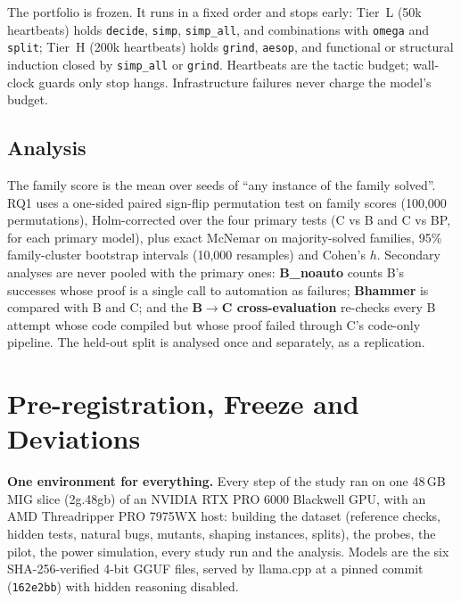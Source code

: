 \documentclass[10pt,twocolumn]{article}
\begin{document}
The portfolio is frozen. It runs in a fixed order and stops early: Tier~L (50k heartbeats) holds
\texttt{decide}, \texttt{simp}, \texttt{simp\_all}, and combinations with \texttt{omega} and \texttt{split};
Tier~H (200k heartbeats) holds \texttt{grind}, \texttt{aesop}, and functional or structural induction closed by
\texttt{simp\_all} or \texttt{grind}. Heartbeats are the tactic budget; wall-clock guards only stop hangs.
Infrastructure failures never charge the model's budget.

\subsection{Analysis}
\label{sec:analysis}
The family score is the mean over seeds of ``any instance of the family solved''. RQ1 uses a one-sided paired
sign-flip permutation test on family scores (100,000 permutations), Holm-corrected over the four primary tests
(C vs B and C vs BP, for each primary model), plus exact McNemar on majority-solved families, 95\%
family-cluster bootstrap intervals (10,000 resamples) and Cohen's $h$. Secondary analyses are never pooled with
the primary ones: \textbf{B\_noauto} counts B's successes whose proof is a single call to automation as
failures; \textbf{Bhammer} is compared with B and C; and the \textbf{B$\to$C cross-evaluation} re-checks every
B attempt whose code compiled but whose proof failed through C's code-only pipeline. The held-out split is
analysed once and separately, as a replication.

\section{Pre-registration, Freeze and Deviations}
\label{sec:prereg}
\textbf{One environment for everything.} Every step of the study ran on one 48\,GB MIG slice (2g.48gb) of an
NVIDIA RTX PRO 6000 Blackwell GPU, with an AMD Threadripper PRO 7975WX host: building the dataset (reference
checks, hidden tests, natural bugs, mutants, shaping instances, splits), the probes, the pilot, the power
simulation, every study run and the analysis. Models are the six SHA-256-verified 4-bit GGUF files, served by
llama.cpp at a pinned commit (\texttt{162e2bb}) with hidden reasoning disabled.
\end{document}
